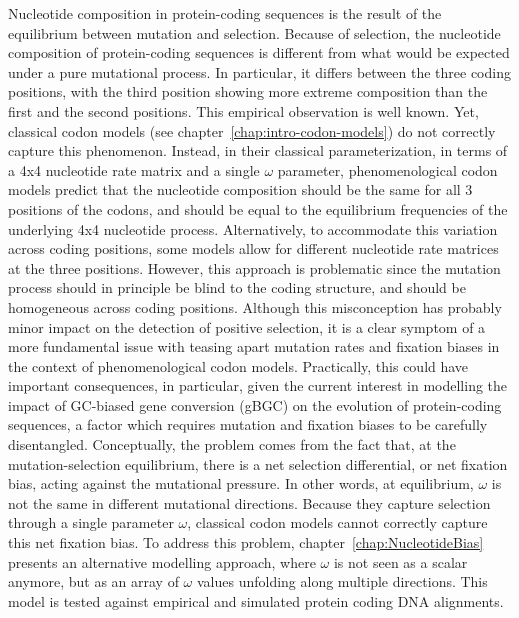 Nucleotide composition in protein-coding sequences is the result of the equilibrium between mutation and selection.
Because of selection, the nucleotide composition of protein-coding sequences is different from what would be expected under a pure mutational process.
In particular, it differs between the three coding positions, with the third position showing more extreme composition than the first and the second positions.
This empirical observation is well known.
Yet, classical \gls{codon} models (see chapter~\ref{chap:intro-codon-models}) do not correctly capture this phenomenon.
Instead, in their classical parameterization, in terms of a 4x4 nucleotide rate matrix and a single $\omega$ parameter, phenomenological \gls{codon} models predict that the nucleotide composition should be the same for all $3$ positions of the \glspl{codon}, and should be equal to the equilibrium frequencies of the underlying 4x4 nucleotide process.
Alternatively, to accommodate this variation across coding positions, some models allow for different nucleotide rate matrices at the three positions.
However, this approach is problematic since the mutation process should in principle be blind to the coding structure, and should be homogeneous across coding positions.
Although this misconception has probably minor impact on the detection of positive selection, it is a clear symptom of a more fundamental issue with teasing apart mutation rates and fixation biases in the context of phenomenological \gls{codon} models.
Practically, this could have important consequences, in particular, given the current interest in modelling the impact of GC-biased gene conversion (\acrshort{gBGC}) on the evolution of protein-coding sequences, a factor which requires mutation and fixation biases to be carefully disentangled.
Conceptually, the problem comes from the fact that, at the mutation-selection equilibrium, there is a net selection differential, or net fixation bias, acting against the mutational pressure.
In other words, at equilibrium, $\omega$ is not the same in different mutational directions.
Because they capture selection through a single parameter $\omega$, classical \gls{codon} models cannot correctly capture this net fixation bias.
To address this problem, chapter~\ref{chap:NucleotideBias} presents an alternative modelling approach, where $\omega$ is not seen as a scalar anymore, but as an array of $\omega$ values unfolding along multiple directions.
This model is tested against empirical and simulated protein coding \acrshort{DNA} alignments.


